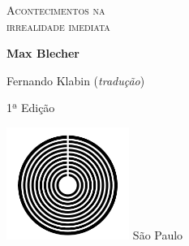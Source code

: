 




\begingroup\thispagestyle{empty}\vspace*{.05\textheight} 

              \formular
              \huge
              \noindent
              \textsc{Acontecimentos na\\irrealidade imediata}
  					  \medskip
                      
  					  \large
              \textit{}
              \normalsize 
              \vspace{2em}

              \Large
              \noindent
              \textbf{Max Blecher}
              \bigskip

              \small
              \noindent
              Fernando Klabin (\textit{tradução})
              \vspace{3em}

              \noindent
   					  1ª Edição
                      

              \vfill
              \noindent
              \includegraphics[width=0.3\textwidth]{logo}
              \break{} São Paulo\quad\the\year
\endgroup
\pagebreak
